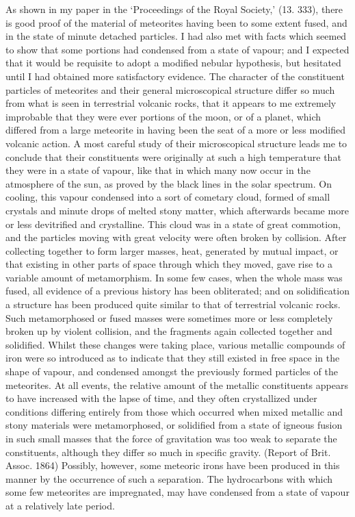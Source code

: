 \documentclass[a4paper, 12pt, oneside]{article}
\begin{document}
As shown in my paper in the `Proceedings of the Royal Society,' (13. 333), there is good proof of the material of meteorites having been to some extent fused, and in the state of minute detached particles. I had also met with facts which seemed to show that some portions had condensed from a state of vapour; and I expected that it would be requisite to adopt a modified nebular hypothesis, but hesitated until I had obtained more satisfactory evidence. The character of the constituent particles of meteorites and their general microscopical structure differ so much from what is seen in terrestrial volcanic rocks, that it appears to me extremely improbable that they were ever portions of the moon, or of a planet, which differed from a large meteorite in having been the seat of a more or less modified volcanic action. A most careful study of their microscopical structure leads me to conclude that their constituents were originally at such a high temperature that they were in a state of vapour, like that in which many now occur in the atmosphere of the sun, as proved by the black lines in the solar spectrum. On cooling, this vapour condensed into a sort of cometary cloud, formed of small crystals and minute drops of melted stony matter, which afterwards became more or less devitrified and crystalline. This cloud was in a state of great commotion, and the particles moving with great velocity were often broken by collision. After collecting together to form larger masses, heat, generated by mutual impact, or that existing in other parts of space through which they moved, gave rise to a variable amount of metamorphism. In some few cases, when the whole mass was fused, all evidence of a previous history has been obliterated; and on solidification a structure has been produced quite similar to that of terrestrial volcanic rocks. Such metamorphosed or fused masses were sometimes more or less completely broken up by violent collision, and the fragments again collected together and solidified. Whilst these changes were taking place, various metallic compounds of iron were so introduced as to indicate that they still existed in free space in the shape of vapour, and condensed amongst the previously formed particles of the meteorites. At all events, the relative amount of the metallic constituents appears to have increased with the lapse of time, and they often crystallized under conditions differing entirely from those which occurred when mixed metallic and stony materials were metamorphosed, or solidified from a state of igneous fusion in such small masses that the force of gravitation was too weak to separate the constituents, although they differ so much in specific gravity. (Report of Brit. Assoc. 1864) Possibly, however, some meteoric irons have been produced in this manner by the occurrence of such a separation. The hydrocarbons with which some few meteorites are impregnated, may have condensed from a state of vapour at a relatively late period.
\end{document}
